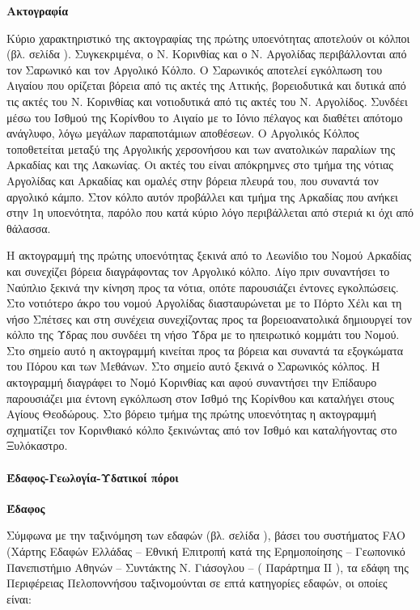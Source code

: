 \documentclass[12pt]{article}
\begin{document}
	\textbf{Ακτογραφία}
	
	Κύριο χαρακτηριστικό της ακτογραφίας της πρώτης υποενότητας αποτελούν οι κόλποι (βλ. σελίδα \pageref{peloponnese}). Συγκεκριμένα, ο Ν. Κορινθίας και ο Ν. Αργολίδας περιβάλλονται από τον Σαρωνικό και τον Αργολικό Κόλπο. Ο Σαρωνικός  αποτελεί εγκόλπωση του Αιγαίου που ορίζεται βόρεια από τις ακτές της Αττικής, βορειοδυτικά και δυτικά από τις ακτές του Ν. Κορινθίας και νοτιοδυτικά από τις ακτές του Ν. Αργολίδος. Συνδέει μέσω του Ισθμού της Κορίνθου το Αιγαίο με το Ιόνιο πέλαγος και διαθέτει απότομο  ανάγλυφο, λόγω μεγάλων παραποτάμιων αποθέσεων. Ο Αργολικός Κόλπος τοποθετείται μεταξύ της Αργολικής χερσονήσου και των ανατολικών παραλίων της Αρκαδίας και της Λακωνίας. Οι ακτές του είναι απόκρημνες στο τμήμα της νότιας Αργολίδας και Αρκαδίας και ομαλές στην βόρεια πλευρά του, που συναντά τον αργολικό κάμπο. Στον κόλπο αυτόν προβάλλει και τμήμα της Αρκαδίας που ανήκει στην 1η υποενότητα, παρόλο που κατά κύριο λόγο περιβάλλεται από στεριά κι όχι από θάλασσα.
	
	 Η ακτογραμμή της πρώτης υποενότητας ξεκινά από το Λεωνίδιο του Νομού Αρκαδίας και συνεχίζει βόρεια διαγράφοντας τον Αργολικό κόλπο. Λίγο πριν συναντήσει το Ναύπλιο ξεκινά την κίνηση προς τα νότια, οπότε παρουσιάζει έντονες εγκολπώσεις. Στο νοτιότερο άκρο του νομού Αργολίδας διασταυρώνεται με το Πόρτο Χέλι και τη νήσο Σπέτσες και στη συνέχεια συνεχίζοντας προς τα βορειοανατολικά δημιουργεί τον κόλπο της Ύδρας που συνδέει τη νήσο Ύδρα με το ηπειρωτικό κομμάτι του Νομού. Στο σημείο αυτό η ακτογραμμή κινείται προς τα βόρεια και συναντά τα εξογκώματα του Πόρου και των Μεθάνων. Στο σημείο αυτό ξεκινά ο Σαρωνικός κόλπος. Η ακτογραμμή διαγράφει το Νομό Κορινθίας και αφού συναντήσει την Επίδαυρο παρουσιάζει μια έντονη εγκόλπωση στον Ισθμό της Κορίνθου και καταλήγει στους Αγίους Θεοδώρους. Στο βόρειο τμήμα της πρώτης υποενότητας η ακτογραμμή σχηματίζει τον Κορινθιακό κόλπο ξεκινώντας από τον Ισθμό και καταλήγοντας στο Ξυλόκαστρο.  
	 
	 \paragraph{Έδαφος-Γεωλογία-Υδατικοί πόροι}
	 
	 \textbf{Έδαφος}
	 
	 Σύμφωνα με την ταξινόμηση των εδαφών (βλ. σελίδα \pageref{edafidafi}), βάσει του συστήματος FAO (Χάρτης Εδαφών Ελλάδας – Εθνική Επιτροπή κατά της Ερημοποίησης – Γεωπονικό Πανεπιστήμιο Αθηνών – Συντάκτης Ν. Γιάσογλου – ( Παράρτημα IΙ ), τα εδάφη της Περιφέρειας Πελοποννήσου ταξινομούνται σε επτά κατηγορίες εδαφών, οι οποίες είναι:
	 
\end{document}
